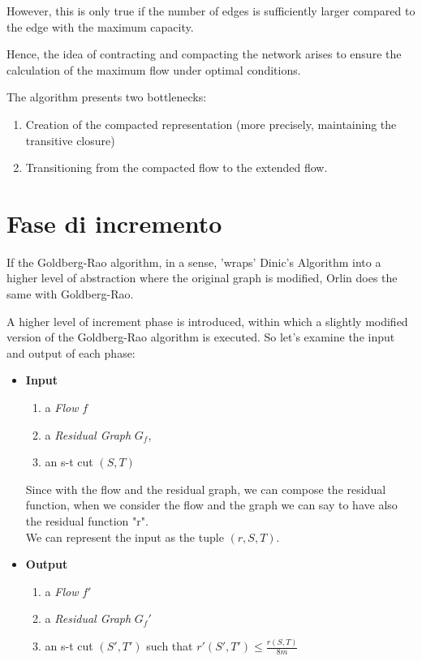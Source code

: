     However, this is only true if the number of edges is sufficiently larger compared to the edge with the maximum capacity.  
    
    Hence, the idea of contracting and compacting the network arises to ensure the calculation of the maximum flow under optimal conditions.

    The algorithm presents two bottlenecks:
    \begin{enumerate}
        \item Creation of the compacted representation (more precisely, maintaining the transitive closure)
        \item Transitioning from the compacted flow to the extended flow.
    \end{enumerate}

\section{Fase di incremento}
If the Goldberg-Rao algorithm, in a sense, 'wraps' Dinic's Algorithm into a higher level of abstraction where the original graph is modified, Orlin does the same with Goldberg-Rao.

A higher level of increment phase is introduced, within which a slightly modified version of the Goldberg-Rao algorithm is executed.
So let's examine the input and output of each phase:

\begin{itemize}[itemsep=0.5ex]
    \item \textbf{Input}
    \begin{enumerate}
        \item a \textit{Flow} \(f\)
        \item a \textit{Residual Graph} \(G_f\), 
        \item an s-t cut \((S,T)\)
    \end{enumerate}
    Since with the flow and the residual graph, we can compose the residual function, when we consider the flow and the graph we can say to have also the residual function "r". \\
    We can represent the input as the tuple \((r, S, T)\).
    
    \item \textbf{Output}
    \begin{enumerate}
        \item a \textit{Flow} \(f'\)
        \item a \textit{Residual Graph} \(G_f'\)
        \item an s-t cut \((S', T')\) such that \(r'(S', T') \leq \frac{r(S, T)}{8m}\)
    \end{enumerate}
\end{itemize}

